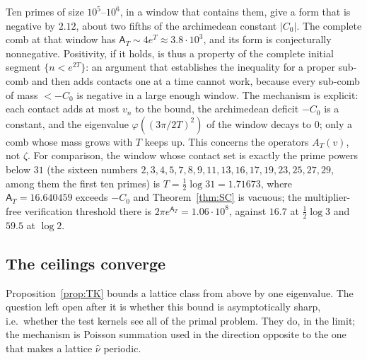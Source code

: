\documentclass[11pt]{amsart}
\theoremstyle{definition}
\theoremstyle{remark}
\newcommand{\nuh}{\widehat\nu}
\newcommand{\Aconst}{\mathsf A_T}
\begin{document}
Ten primes of size $10^5$--$10^6$, in a window that contains them, give a form that is negative by
$2.12$, about two fifths of the archimedean constant $|C_0|$. The complete comb at that window has
$\Aconst\sim4e^T\approx3.8\cdot10^3$, and its form is conjecturally nonnegative. Positivity, if it
holds, is thus a property of the complete initial segment $\{n<e^{2T}\}$: an argument that
establishes the inequality for a proper sub-comb and then adds contacts one at a time cannot work,
because every sub-comb of mass $<-C_0$ is negative in a large enough window. The mechanism is
explicit: each contact adds at most $v_n$ to the bound, the archimedean deficit $-C_0$ is a
constant, and the eigenvalue $\varphi((3\pi/2T)^2)$ of the window decays to $0$; only a comb whose
mass grows with $T$ keeps up. This concerns the operators $A_T(v)$, not $\zeta$. For comparison, the
window whose contact set is exactly the prime powers below $31$ (the sixteen numbers
$2,3,4,5,7,8,9,11,13,16,17,19,23,25,27,29$, among them the first ten primes) is
$T=\frac12\log31=1.71673$, where $\Aconst=16.640459$ exceeds $-C_0$ and Theorem~\ref{thm:SC} is
vacuous; the multiplier-free verification threshold there is
$2\pi e^{\Aconst}=1.06\cdot10^8$, against $16.7$ at $\frac12\log3$ and $59.5$ at $\log2$.


\subsection{The ceilings converge}\label{subsec:R}
Proposition~\ref{prop:TK} bounds a lattice class from above by one eigenvalue. The question left
open after it is whether this bound is asymptotically sharp, i.e.\ whether the test kernels see all
of the primal problem. They do, in the limit; the mechanism is Poisson summation used in the
direction opposite to the one that makes a lattice $\nuh$ periodic.
\end{document}
